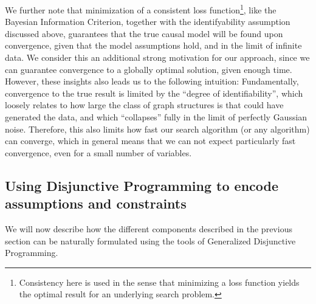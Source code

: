 \documentclass[11pt]{article}
\begin{document}
We further note that minimization of a consistent loss function\footnote{Consistency here is used in the sense that minimizing a loss function yields the optimal result for an underlying search problem.}, like the Bayesian Information Criterion, together with the identifyability assumption discussed above, guarantees that the true causal model will be found upon convergence, given that the model assumptions hold, and in the limit of infinite data.
We consider this an additional strong motivation for our approach, since we can guarantee convergence to a globally optimal solution, given enough time.
However, these insights also leads us to the following intuition:
Fundamentally, convergence to the true result is limited by the ``degree of identifiability'', which loosely relates to how large the class of graph structures is that could have generated the data, and which ``collapses'' fully in the limit of perfectly Gaussian noise.
Therefore, this also limits how fast our search algorithm (or any algorithm) can converge, which in general means that we can not expect particularly fast convergence, even for a small number of variables.

\subsection{Using Disjunctive Programming to encode assumptions and constraints}
\label{sec:org6312e69}
We will now describe how the different components described in the previous section can be naturally formulated using the tools of Generalized Disjunctive Programming.
\end{document}
